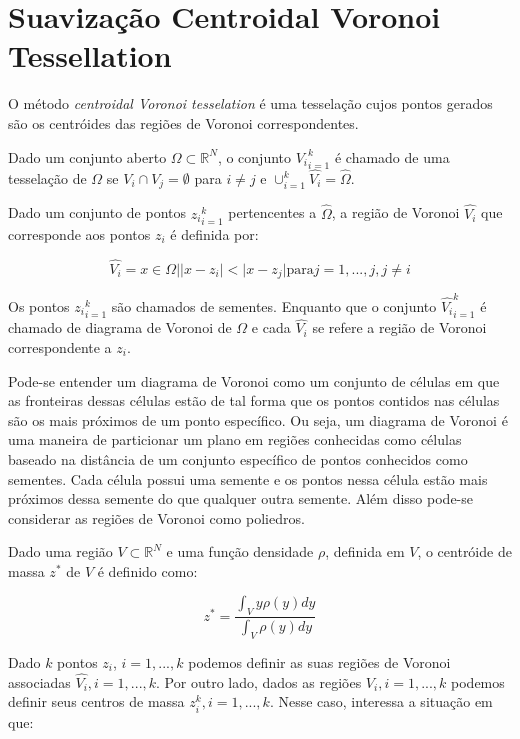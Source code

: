 \section{Suavização Centroidal Voronoi Tessellation}

O método \textit{centroidal Voronoi tesselation} é uma tesselação cujos pontos gerados são os centróides das regiões de Voronoi correspondentes. \cite{Du1999}

Dado um conjunto aberto $\Omega \subset \mathbb{R}^N$, o conjunto ${V_i}_{i=1}^k$ é chamado de uma tesselação de $\Omega$ se $V_i \cap V_j = \emptyset$ para $i \neq j$ e $\cup_{i=1}^k \hat{V_i} = \hat{\Omega}$.

Dado um conjunto de pontos ${z_i}_{i=1}^k$ pertencentes a $\hat{\Omega}$, a região de Voronoi $\hat{V_i}$ que corresponde aos pontos $z_i$ é definida por:

\begin{equation}
    \hat{V_i} = {x \in \Omega |  |x-z_i| < |x-z_j| \text{para} j=1,...,j, j \neq i }
\end{equation}

Os pontos ${z_i}_{i=1}^k$ são chamados de sementes. Enquanto que o conjunto ${\hat{V_i}}_{i=1}^k$ é chamado de diagrama de Voronoi de $\Omega$ e cada $\hat{V_i}$ se refere a região de Voronoi correspondente a $z_i$.

Pode-se entender um diagrama de Voronoi como um conjunto de células em que as fronteiras dessas células estão de tal forma que os pontos contidos nas células são os mais próximos de um ponto específico. Ou seja, um diagrama de Voronoi é uma maneira de particionar um plano em regiões conhecidas como células baseado na distância de um conjunto específico de pontos conhecidos como sementes. Cada célula possui uma semente e os pontos nessa célula estão mais próximos dessa semente do que qualquer outra semente. Além disso pode-se considerar as regiões de Voronoi como poliedros.

Dado uma região $V \subset \mathbb{R}^N$ e uma função densidade $\rho$, definida em $V$, o centróide de massa $z^*$ de $V$ é definido como:

\begin{equation}
    z^* = \frac{\int_V y \rho(y) dy}{\int_V \rho(y) dy}
\end{equation}

Dado $k$ pontos $z_i$, $i=1,...,k$ podemos definir as suas regiões de Voronoi associadas $\hat{V_i},i=1,...,k$. Por outro lado, dados as regiões $\hat{V_i},i=1,...,k$ podemos definir seus centros de massa $z_i^k,i=1,...,k$. Nesse caso, interessa a situação em que:

